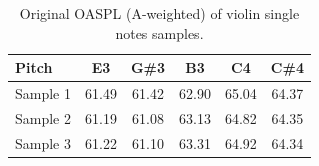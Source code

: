 \begin{table}[ht]
\caption{Original OASPL (A-weighted) of violin single notes samples.}
\vskip3pt
\setlength{\tabcolsep}{6pt}
\begin{tabular}{l|ccccc}
\hline\hline
Pitch & E3 & G\#3 & B3 & C4 & C\#4 \\
\hline
Sample 1 & 61.49 & 61.42 & 62.90 & 65.04 & 64.37 \\
Sample 2 & 61.19 & 61.08 & 63.13 & 64.82 & 64.35 \\
Sample 3 & 61.22 & 61.10 & 63.31 & 64.92 & 64.34 \\
\hline\hline
\end{tabular}
\label{violinOASPL}
\end{table}
